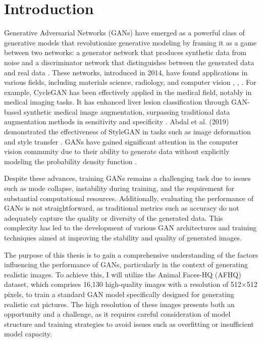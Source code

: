\chapter{Introduction}


Generative Adversarial Networks (GANs) have emerged as a powerful class of generative models that revolutionize 
generative modeling by framing it as a game between two networks: a generator network that produces synthetic data 
from noise and a discriminator network that distinguishes between the generated data and real data \citep{10.48550/arxiv.1704.00028}. 
These networks, introduced in 2014, have found applications in various fields, including materials science, 
radiology, and computer vision \citep{10.1002/mgea.30}, \citep{10.1016/j.media.2019.101552}, \citep{10.1016/j.artmed.2020.101938}. 
For example, CycleGAN has been effectively applied in the medical field, notably in medical imaging tasks. 
It has enhanced liver lesion classification through GAN-based synthetic medical image augmentation, surpassing traditional data 
augmentation methods in sensitivity and specificity \citep{10.1016/j.neucom.2018.09.013}. 
Abdal et al. (2019) demonstrated the effectiveness of StyleGAN in tasks such as image deformation and style transfer \citep{10.1109/iccv.2019.00453}. 
GANs have gained significant attention in the computer vision community due to their ability to generate data without explicitly 
modeling the probability density function \citep{10.1016/j.media.2019.101552}.

Despite these advances, training GANs remains a challenging task due to issues such as mode collapse, instability during training, 
and the requirement for substantial computational resources. Additionally, evaluating the performance of GANs is not straightforward, 
as traditional metrics such as accuracy do not adequately capture the quality or diversity of the generated data. This complexity has 
led to the development of various GAN architectures and training techniques aimed at improving the stability and quality of generated images.

The purpose of this thesis is to gain a comprehensive understanding of the factors influencing the performance of GANs, 
particularly in the context of generating realistic images. To achieve this, I will utilize the Animal Faces-HQ (AFHQ) dataset, 
which comprises 16,130 high-quality images with a resolution of 512×512 pixels, to train a standard GAN model specifically designed 
for generating realistic cat pictures. The high resolution of these images presents both an opportunity and a challenge, as it requires 
careful consideration of model structure and training strategies to avoid issues such as overfitting or insufficient model capacity.

